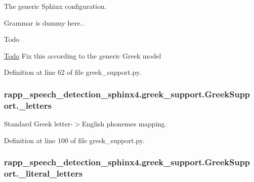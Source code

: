 The generic Sphinx configuration. 

Grammar is dummy here.. \begin{DoxyRefDesc}{Todo}
\item[\hyperlink{todo__todo000001}{Todo}]Fix this according to the generic Greek model \end{DoxyRefDesc}


Definition at line 62 of file greek\-\_\-support.\-py.

\hypertarget{classrapp__speech__detection__sphinx4_1_1greek__support_1_1GreekSupport_a6115cc5d04ce7f8e891f5b112f8d4151}{
\subsubsection[{\-\_\-letters}]{\setlength{\rightskip}{0pt plus 5cm}rapp\-\_\-speech\-\_\-detection\-\_\-sphinx4.\-greek\-\_\-support.\-Greek\-Support.\-\_\-letters\hspace{0.3cm}{\ttfamily [private]}}}\label{classrapp__speech__detection__sphinx4_1_1greek__support_1_1GreekSupport_a6115cc5d04ce7f8e891f5b112f8d4151}


Standard Greek letter-\/$>$English phonemes mapping. 



Definition at line 100 of file greek\-\_\-support.\-py.

\hypertarget{classrapp__speech__detection__sphinx4_1_1greek__support_1_1GreekSupport_a553a5e8b07dc6b3b9b83a2f814535204}{
\subsubsection[{\-\_\-literal\-\_\-letters}]{\setlength{\rightskip}{0pt plus 5cm}rapp\-\_\-speech\-\_\-detection\-\_\-sphinx4.\-greek\-\_\-support.\-Greek\-Support.\-\_\-literal\-\_\-letters\hspace{0.3cm}{\ttfamily [private]}}}\label{classrapp__speech__detection__sphinx4_1_1greek__support_1_1GreekSupport_a553a5e8b07dc6b3b9b83a2f814535204}


